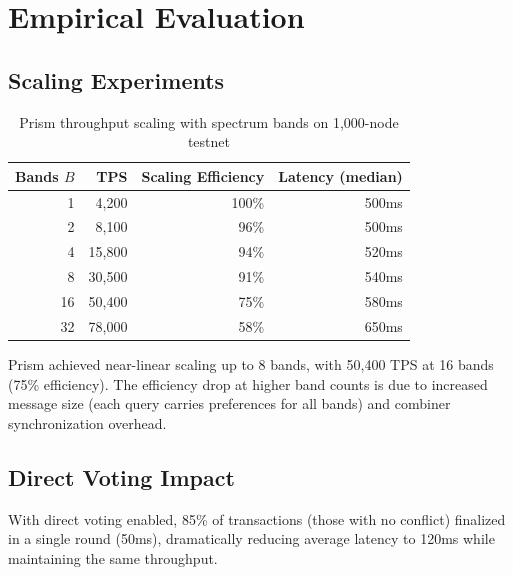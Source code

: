 \section{Empirical Evaluation}

\label{sec:evaluation}

\subsection{Scaling Experiments}

\begin{table}[h]
\centering
\begin{tabular}{@{}rrrr@{}}
\toprule
\textbf{Bands $B$} & \textbf{TPS} & \textbf{Scaling Efficiency} & \textbf{Latency (median)} \\
\midrule
1 & 4,200 & 100\% & 500ms \\
2 & 8,100 & 96\% & 500ms \\
4 & 15,800 & 94\% & 520ms \\
8 & 30,500 & 91\% & 540ms \\
16 & 50,400 & 75\% & 580ms \\
32 & 78,000 & 58\% & 650ms \\
\bottomrule
\end{tabular}
\caption{Prism throughput scaling with spectrum bands on 1,000-node testnet}
\label{tab:scaling}
\end{table}

Prism achieved near-linear scaling up to 8 bands, with 50,400 TPS at 16 bands (75\%
efficiency). The efficiency drop at higher band counts is due to increased message size
(each query carries preferences for all bands) and combiner synchronization overhead.

\subsection{Direct Voting Impact}

With direct voting enabled, 85\% of transactions (those with no conflict) finalized
in a single round (50ms), dramatically reducing average latency to 120ms while
maintaining the same throughput.

